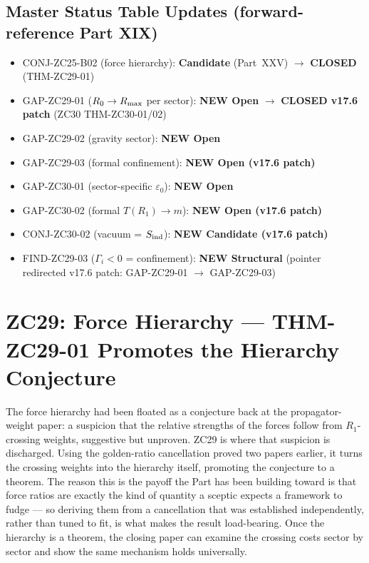 \documentclass[12pt, a4paper]{article}
\begin{document}
\subsection*{Master Status Table Updates (forward-reference Part XIX)}

\begin{itemize}[leftmargin=*, noitemsep]
\item CONJ-ZC25-B02 (force hierarchy): \textbf{Candidate} (Part~XXV) $\to$
  \textbf{CLOSED} (THM-ZC29-01)
\item GAP-ZC29-01 ($R_0 \to R_{\rm max}$ per sector): \textbf{NEW Open} $\to$
  \textbf{CLOSED v17.6 patch} (ZC30 THM-ZC30-01/02)
\item GAP-ZC29-02 (gravity sector): \textbf{NEW Open}
\item GAP-ZC29-03 (formal confinement): \textbf{NEW Open (v17.6 patch)}
\item GAP-ZC30-01 (sector-specific $\varepsilon_0$): \textbf{NEW Open}
\item GAP-ZC30-02 (formal $T(R_1) \to m$): \textbf{NEW Open (v17.6 patch)}
\item CONJ-ZC30-02 (vacuum = $S_{\rm ind}$): \textbf{NEW Candidate (v17.6 patch)}
\item FIND-ZC29-03 ($\Gamma_i < 0$ = confinement): \textbf{NEW Structural}
  (pointer redirected v17.6 patch: GAP-ZC29-01 $\to$ GAP-ZC29-03)
\end{itemize}

\section{ZC29: Force Hierarchy --- THM-ZC29-01 Promotes the Hierarchy Conjecture}
\label{sec:zc29-force-hierarchy}

The force hierarchy had been floated as a conjecture back at the propagator-weight
paper: a suspicion that the relative strengths of the forces follow from
$R_1$-crossing weights, suggestive but unproven. ZC29 is where that suspicion is
discharged. Using the golden-ratio cancellation proved two papers earlier, it
turns the crossing weights into the hierarchy itself, promoting the conjecture to
a theorem. The reason this is the payoff the Part has been building toward is that
force ratios are exactly the kind of quantity a sceptic expects a framework to
fudge --- so deriving them from a cancellation that was established independently,
rather than tuned to fit, is what makes the result load-bearing. Once the
hierarchy is a theorem, the closing paper can examine the crossing costs sector by
sector and show the same mechanism holds universally.
\end{document}
